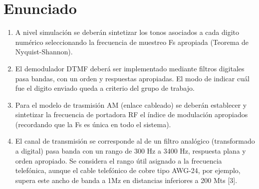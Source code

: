 \section{Enunciado}
\begin{enumerate}[label=\alph*)]
  \item A nivel simulación se deberán sintetizar los tonos asociados a cada digito numérico seleccionando la frecuencia de muestreo Fs apropiada (Teorema de Nyquist-Shannon).
  \item El demodulador DTMF deberá ser
        implementado mediante filtros
        digitales pasa bandas, con un
        orden y respuestas apropiadas. El
        modo de indicar cuál fue el digito
        enviado queda a criterio del grupo
        de trabajo.
  \item Para el modelo de trasmisión AM
        (enlace cableado) se deberán
        establecer y sintetizar la frecuencia
        de portadora RF el índice de
        modulación apropiados
        (recordando que la Fs es única en
        todo el sistema).
  \item El canal de transmisión se
        corresponde al de un filtro
        analógico (transformado a digital)
        pasa banda con un rango de 300 Hz
        a 3400 Hz, respuesta plana y orden
        apropiado. Se considera el rango
        útil asignado a la frecuencia
        telefónica, aunque el cable
        telefónico de cobre tipo AWG-24,
        por ejemplo, supera este ancho de
        banda a 1Mz en distancias
        inferiores a 200 Mts [3].
\end{enumerate}

